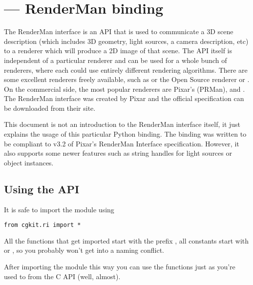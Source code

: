 \section{ ---
         RenderMan binding}


The RenderMan\textsuperscript{\textregistered} interface is an API
that is used to communicate a 3D scene description (which includes 3D
geometry, light sources, a camera description, etc) to a renderer
which will produce a 2D image of that scene. The API itself is
independent of a particular renderer and can be used for a whole bunch
of renderers, where each could use entirely different rendering
algorithms. There are some excellent renderers freely available, such
as  or the Open Source renderer 
 or
. On the
commercial side, the most popular renderers are Pixar's
 (PRMan), 
 and 
. 
The RenderMan interface was
created by Pixar and the official specification can be downloaded from
their site.

This document is not an introduction to the RenderMan interface
itself, it just explains the usage of this particular Python
binding. The binding was written to be compliant to v3.2 of Pixar's
RenderMan Interface specification. However, it also supports some
newer features such as string handles for light sources or object
instances.

\subsection{Using the API}

It is safe to import the module using 

\begin{verbatim}
from cgkit.ri import * 
\end{verbatim}

All the functions that get imported start with the prefix ,
all constants start with  or , so you probably
won't get into a naming conflict.

After importing the module this way you can use the functions just as
you're used to from the C API (well, almost).

